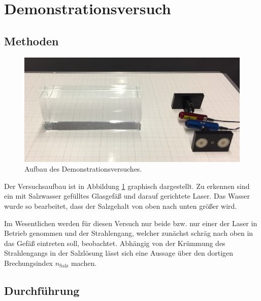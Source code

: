 \section{Demonstrationsversuch}
	
	\subsection{Methoden}
				
			\begin{figure}[ht]
				\centering
				\includegraphics[width=\textwidth]{bilder/aufbau1.jpg}
				\caption{Aufbau des Demonstrationsversuches.\cite{WWU}}
				\label{fig:Aufbau1}	
			\end{figure}
			Der Versuchsaufbau ist in Abbildung \ref{fig:Aufbau1} graphisch dargestellt.
			Zu erkennen sind ein mit Salzwasser gefülltes Glasgefäß und darauf gerichtete Laser. 
			Das Wasser wurde so bearbeitet, dass der Salzgehalt von oben nach unten größer wird.
			
			Im Wesentlichen werden für diesen Versuch nur beide bzw. nur einer der Laser in Betrieb genommen und der Strahlengang, welcher zunächst schräg nach oben in das Gefäß eintreten soll, beobachtet.
			Abhängig von der Krümmung des Strahlengangs in der Salzlösung lässt sich eine Aussage über den dortigen Brechungsindex $n_\text{Salz}$ machen.
			
	\subsection{Durchführung}
		
